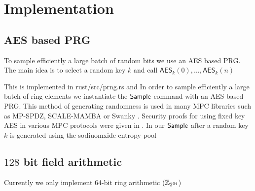 \section{Implementation}

\subsection{AES based PRG}
\label{sec:aes}

To sample efficiently a large batch of random bits we use an AES based PRG. 
The main idea is to select a random key $k$ and call $\mathsf{AES}_k(0), \dots, \mathsf{AES}_k(n)$

This is implemented in \textsf{rust/src/prng.rs} and 
In order to sample efficiently a large batch of ring elements we instantiate
the $\mathsf{Sample}$ command with an AES based PRG. This method of generating
randomness is used in many MPC libraries such as MP-SPDZ, SCALE-MAMBA or Swanky \cite{url-swanky}.
Security proofs for using fixed key AES in various MPC protocols were given in \cite{xiao-paper}.
In our $\mathsf{Sample}$ after a random key $k$ is generated using the sodiuomxide entropy pool

\subsection{$128$ bit field arithmetic}
Currently we only implement 64-bit ring arithmetic ($\mathbb{Z}_{2^{64}}$)

